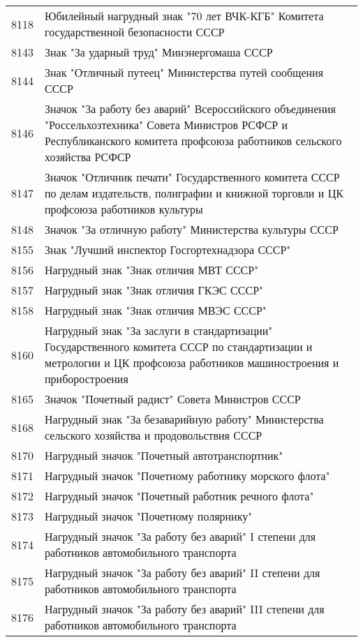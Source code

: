 \documentclass[10pt, a4paper, titlepage]{article}
\begin{document}
\begin{center}
\begin{longtable}{rp{}}
        8118 & Юбилейный нагрудный знак "70 лет ВЧК-КГБ" Комитета государственной безопасности СССР \\
        8143 & Знак "За ударный труд" Минэнергомаша СССР \\
        8144 & Знак "Отличный путеец" Министерства путей сообщения СССР \\
        8146 & Значок "За работу без аварий" Всероссийского объединения "Россельхозтехника" Совета Министров РСФСР и Республиканского комитета профсоюза работников сельского хозяйства РСФСР \\
        8147 & Значок "Отличник печати" Государственного комитета СССР по делам издательств, полиграфии и книжной торговли и ЦК профсоюза работников культуры \\
        8148 & Значок "За отличную работу" Министерства культуры СССР \\
        8155 & Знак "Лучший инспектор Госгортехнадзора СССР" \\
        8156 & Нагрудный знак "Знак отличия МВТ СССР" \\
        8157 & Нагрудный знак "Знак отличия ГКЭС СССР" \\
        8158 & Нагрудный знак "Знак отличия МВЭС СССР" \\
        8160 & Нагрудный знак "За заслуги в стандартизации" Государственного комитета СССР по стандартизации и метрологии и ЦК профсоюза работников машиностроения и приборостроения \\
        8165 & Значок "Почетный радист" Совета Министров СССР \\
        8168 & Нагрудный знак "За безаварийную работу" Министерства сельского хозяйства и продовольствия СССР \\
        8170 & Нагрудный значок "Почетный автотранспортник" \\
        8171 & Нагрудный значок "Почетному работнику морского флота" \\
        8172 & Нагрудный значок "Почетный работник речного флота" \\
        8173 & Нагрудный значок "Почетному полярнику" \\
        8174 & Нагрудный значок "За работу без аварий" I степени для работников автомобильного транспорта \\
        8175 & Нагрудный значок "За работу без аварий" II степени для работников автомобильного транспорта \\
        8176 & Нагрудный значок "За работу без аварий" III степени для работников автомобильного транспорта \\

\end{longtable}
\end{center}
\end{document}
